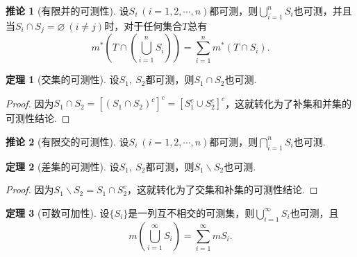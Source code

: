 \documentclass[lang=cn,12pt]{ctexart}
\theoremstyle{definition}
\newtheorem{theorem}{定理}
\newtheorem{corollary}{推论}
\theoremstyle{plain}
\begin{document}
\begin{corollary}[有限并的可测性]
	设$S_i\ (i=1,2,\cdots,n)$都可测，则$\bigcup\limits_{i=1}^nS_i$也可测，并且当$S_i\cap S_j=\varnothing\ (i\neq j)$时，对于任何集合$T$总有
	$$m^*\left(T\cap\left(\bigcup_{i=1}^{n}S_i\right)\right)=\sum_{i=1}^{n}m^*(T\cap S_i).$$
\end{corollary}
\begin{theorem}[交集的可测性]
	设$S_1,\ S_2$都可测，则$S_1\cap S_2$也可测.
\end{theorem}
\begin{proof}
	因为$S_1\cap S_2=\left[(S_1\cap S_2)^c\right]^c=\left[S_1^c\cup S_2^c\right]^c$，这就转化为了补集和并集的可测性结论.
\end{proof}
\begin{corollary}[有限交的可测性]
	设$S_i\ (i=1,2,\cdots,n)$都可测，则$\bigcap\limits_{i=1}^{n}S_i$也可测.
\end{corollary}
\begin{theorem}[差集的可测性]
	设$S_1,\ S_2$都可测，则$S_1\backslash S_2$也可测.
\end{theorem}
\begin{proof}
	因为$S_1\backslash S_2=S_1\cap S_2^c$，这就转化为了交集和补集的可测性结论.
\end{proof}
\begin{theorem}[可数可加性]\label{countable}
	设$\{S_i\}$是一列互不相交的可测集，则$\bigcup\limits_{i=1}^{\infty}S_i$也可测，且
	$$m\left(\bigcup_{i=1}^{\infty}S_i\right)=\sum_{i=1}^{\infty}mS_i.$$
\end{theorem}
\end{document}
